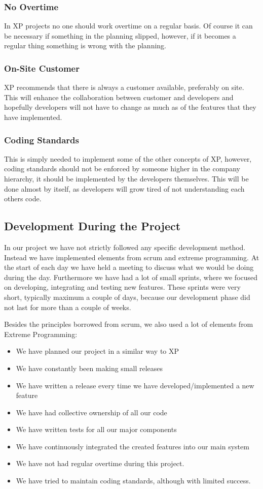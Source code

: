 \subsubsection{No Overtime}
In XP projects no one should work overtime on a regular basis.
Of course it can be necessary if something in the planning slipped, however, if it becomes a regular thing something is wrong with the planning.

\subsubsection{On-Site Customer}
XP recommends that there is always a customer available, preferably on site.
This will enhance the collaboration between customer and developers and hopefully developers will not have to change as much as of the features that they have implemented.

\subsubsection{Coding Standards}
This is simply needed to implement some of the other concepts of XP, however, coding standards should not be enforced by someone higher in the company hierarchy, it should be implemented by the developers themselves.
This will be done almost by itself, as developers will grow tired of not understanding each others code.
\cite{xp} \cite{xp2}
\subsection{Development During the Project}
\label{sub:ourDevMethod}
In our project we have not strictly followed any specific development method. Instead we have implemented elements from scrum and extreme programming. At the start of each day we have held a meeting to discuss what we would be doing during the day. Furthermore we have had a lot of small sprints, where we focused on developing, integrating and testing new features. These sprints were very short, typically maximum a couple of days, because our development phase did not last for more than a couple of weeks.

Besides the principles borrowed from scrum, we also used a lot of elements from Extreme Programming:
\begin{itemize}
\item We have planned our project in a similar way to XP
\item We have constantly been making small releases 
\item We have written a release every time we have developed/implemented a new feature
\item We have had collective ownership of all our code
\item We have written tests for all our major components 
\item We have continuously integrated the created features into our main system
\item We have not had regular overtime during this project.
\item We have tried to maintain coding standards, although with limited success.
\end{itemize}

